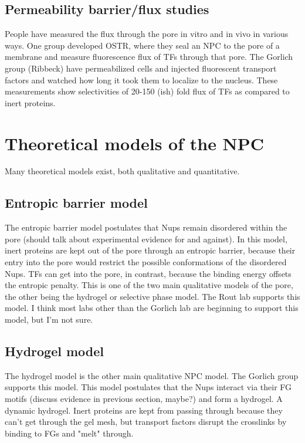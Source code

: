 \subsection{Permeability barrier/flux studies}
People have measured the flux through the pore in vitro and in vivo in various ways.  One group developed OSTR, where they seal an NPC to the pore of a membrane and measure fluorescence flux of TFs through that pore.  The Gorlich group (Ribbeck) have permeabilized cells and injected fluorescent transport factors and watched how long it took them to localize to the nucleus.  These measurements show selectivities of 20-150 (ish) fold flux of TFs as compared to inert proteins.



\section{Theoretical models of the NPC}
Many theoretical models exist, both qualitative and quantitative.
\subsection{Entropic barrier model}
The entropic barrier model postulates that Nups remain disordered within the pore (should talk about experimental evidence for and against).  In this model, inert proteins are kept out of the pore through an entropic barrier, because their entry into the pore would restrict the possible conformations of the disordered Nups.  TFs can get into the pore, in contrast, because the binding energy offsets the entropic penalty.  This is one of the two main qualitative models of the pore, the other being the hydrogel or selective phase model.  The Rout lab supports this model.  I think most labs other than the Gorlich lab are beginning to support this model, but I'm not sure.
\subsection{Hydrogel model}
The hydrogel model is the other main qualitative NPC model.  The Gorlich group supports this model.  This model postulates that the Nups interact via their FG motifs (discuss evidence in previous section, maybe?) and form a hydrogel.  A dynamic hydrogel.  Inert proteins are kept from passing through because they can't get through the gel mesh, but transport factors disrupt the crosslinks by binding to FGs and "melt" through.
